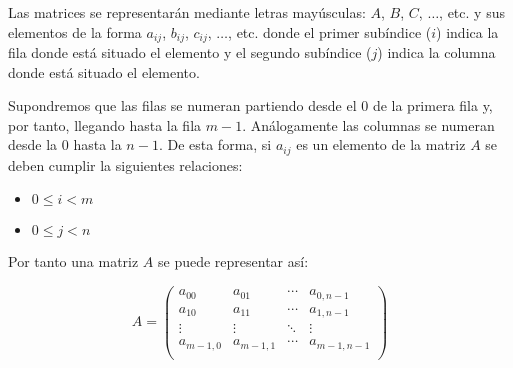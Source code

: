 \documentclass[a4paper,10pt]{article}
\begin{document}
Las matrices se representarán mediante letras mayúsculas: $A$, $B$, $C$, $\dots$, etc. y sus elementos de la forma $a_{ij}$, $b_{ij}$, $c_{ij}$, $\dots$, etc. donde el primer subíndice ($i$) indica la fila donde está situado el elemento y el segundo subíndice ($j$) indica la columna donde está situado el elemento.

\par \vspace{10pt}

Supondremos que las filas se numeran partiendo desde el 0 de la primera fila y, por tanto, llegando hasta la fila $m - 1$. Análogamente las columnas se numeran desde la $0$ hasta la $n - 1$. De esta forma, si $a_{ij}$ es un elemento de la matriz $A$ se deben cumplir la siguientes relaciones:
\begin{itemize}
	\item $0 \leq i < m$
	\item $0 \leq j < n$
\end{itemize}

\par \vspace{10pt}

Por tanto una matriz $A$ se puede representar así:

$$
A=
\begin{pmatrix}
a_{00} & a_{01} & \cdots & a_{0,n-1} \\
a_{10} & a_{11} & \cdots & a_{1,n-1} \\
\vdots & \vdots & \ddots & \vdots \\ 
a_{m-1,0} & a_{m-1,1} & \cdots & a_{m-1,n-1} \\
\end{pmatrix}
$$

\par \vspace{10pt}
\end{document}
